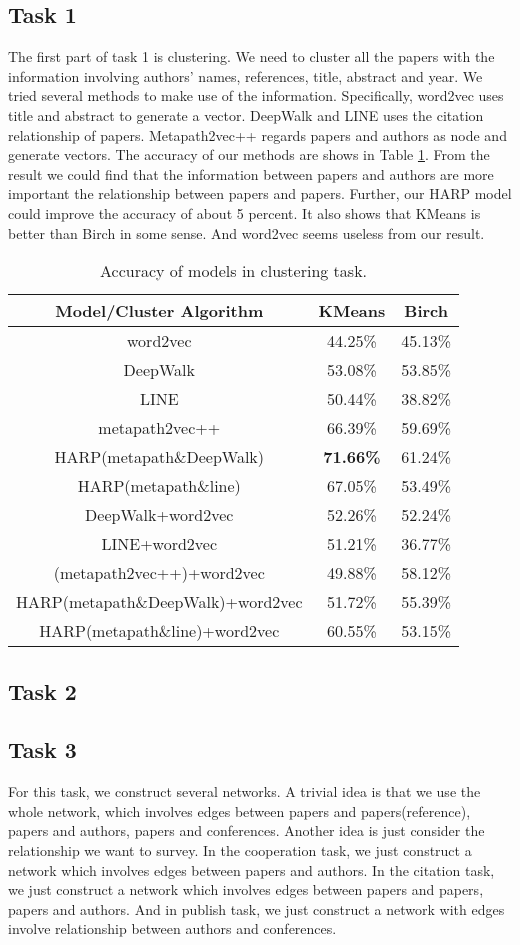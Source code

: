 \documentclass[conference]{IEEEtran}
\begin{document}
\subsection{Task 1}
The first part of task 1 is clustering. We need to cluster all the papers with the information involving authors' names, references, title, abstract and year. We tried several methods to make use of the information. Specifically, word2vec uses title and abstract to generate a vector. DeepWalk and LINE uses the citation relationship of papers. Metapath2vec++ regards papers and authors as node and generate vectors. The accuracy of our methods are shows in Table \ref{task1cluster}. From the result we could find that the information between papers and authors are more important the relationship between papers and papers. Further, our HARP model could improve the accuracy of about 5 percent. It also shows that KMeans is better than Birch in some sense. And word2vec seems useless from our result.
\begin{table}[h]
\center
	\begin{tabular}{c|c|c}
	\hline
	\hline
	\textbf{Model/Cluster Algorithm}& KMeans & Birch\\
	\hline
	\hline
	word2vec&44.25\%&45.13\%\\
	\hline
	DeepWalk &53.08\%&53.85\%\\
	\hline
	LINE&50.44\%&38.82\%\\
	\hline
	metapath2vec++&66.39\%&59.69\%\\
	\hline
	HARP(metapath\&DeepWalk)&\textbf{71.66\%}&61.24\%\\
	\hline
	HARP(metapath\&line)&67.05\%&53.49\%\\
	\hline
	DeepWalk+word2vec&52.26\%&52.24\%\\
	\hline
	LINE+word2vec&51.21\%&36.77\%\\
	\hline
	(metapath2vec++)+word2vec&49.88\%&58.12\%\\
	\hline
	HARP(metapath\&DeepWalk)+word2vec&51.72\%&55.39\%\\
	\hline
	HARP(metapath\&line)+word2vec&60.55\%&53.15\%\\
	\hline
	\hline
	\end{tabular}	
	\caption{Accuracy of models in clustering task.}
	\label{task1cluster}
\end{table}
\subsection{Task 2}
\subsection{Task 3}
For this task, we construct several networks. A trivial idea is that we use the whole network, which involves edges between papers and papers(reference), papers and authors, papers and conferences. Another idea is just consider the relationship we want to survey. In the cooperation task, we just construct a network which involves edges between papers and authors. In the citation task, we just construct a network which involves edges between papers and papers, papers and authors. And in publish task, we just construct a network with edges involve relationship between authors and conferences.
\end{document}
